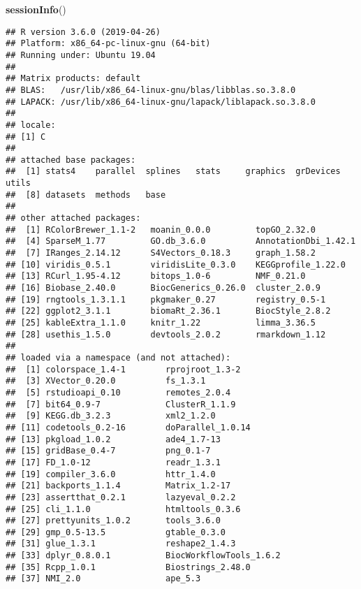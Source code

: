\documentclass[9pt,a4paper,]{extarticle}
\newenvironment{Shaded}{\begin{snugshade}}{\end{snugshade}}
\newcommand{\KeywordTok}[1]{\textcolor[rgb]{0.13,0.29,0.53}{\textbf{#1}}}
\newcommand{\NormalTok}[1]{#1}
\begin{document}
\begin{Shaded}
\begin{Highlighting}[]
\KeywordTok{sessionInfo}\NormalTok{()}
\end{Highlighting}
\end{Shaded}

\begin{verbatim}
## R version 3.6.0 (2019-04-26)
## Platform: x86_64-pc-linux-gnu (64-bit)
## Running under: Ubuntu 19.04
## 
## Matrix products: default
## BLAS:   /usr/lib/x86_64-linux-gnu/blas/libblas.so.3.8.0
## LAPACK: /usr/lib/x86_64-linux-gnu/lapack/liblapack.so.3.8.0
## 
## locale:
## [1] C
## 
## attached base packages:
##  [1] stats4    parallel  splines   stats     graphics  grDevices utils    
##  [8] datasets  methods   base     
## 
## other attached packages:
##  [1] RColorBrewer_1.1-2   moanin_0.0.0         topGO_2.32.0        
##  [4] SparseM_1.77         GO.db_3.6.0          AnnotationDbi_1.42.1
##  [7] IRanges_2.14.12      S4Vectors_0.18.3     graph_1.58.2        
## [10] viridis_0.5.1        viridisLite_0.3.0    KEGGprofile_1.22.0  
## [13] RCurl_1.95-4.12      bitops_1.0-6         NMF_0.21.0          
## [16] Biobase_2.40.0       BiocGenerics_0.26.0  cluster_2.0.9       
## [19] rngtools_1.3.1.1     pkgmaker_0.27        registry_0.5-1      
## [22] ggplot2_3.1.1        biomaRt_2.36.1       BiocStyle_2.8.2     
## [25] kableExtra_1.1.0     knitr_1.22           limma_3.36.5        
## [28] usethis_1.5.0        devtools_2.0.2       rmarkdown_1.12      
## 
## loaded via a namespace (and not attached):
##  [1] colorspace_1.4-1        rprojroot_1.3-2        
##  [3] XVector_0.20.0          fs_1.3.1               
##  [5] rstudioapi_0.10         remotes_2.0.4          
##  [7] bit64_0.9-7             ClusterR_1.1.9         
##  [9] KEGG.db_3.2.3           xml2_1.2.0             
## [11] codetools_0.2-16        doParallel_1.0.14      
## [13] pkgload_1.0.2           ade4_1.7-13            
## [15] gridBase_0.4-7          png_0.1-7              
## [17] FD_1.0-12               readr_1.3.1            
## [19] compiler_3.6.0          httr_1.4.0             
## [21] backports_1.1.4         Matrix_1.2-17          
## [23] assertthat_0.2.1        lazyeval_0.2.2         
## [25] cli_1.1.0               htmltools_0.3.6        
## [27] prettyunits_1.0.2       tools_3.6.0            
## [29] gmp_0.5-13.5            gtable_0.3.0           
## [31] glue_1.3.1              reshape2_1.4.3         
## [33] dplyr_0.8.0.1           BiocWorkflowTools_1.6.2
## [35] Rcpp_1.0.1              Biostrings_2.48.0      
## [37] NMI_2.0                 ape_5.3                

\end{verbatim}
\end{document}
